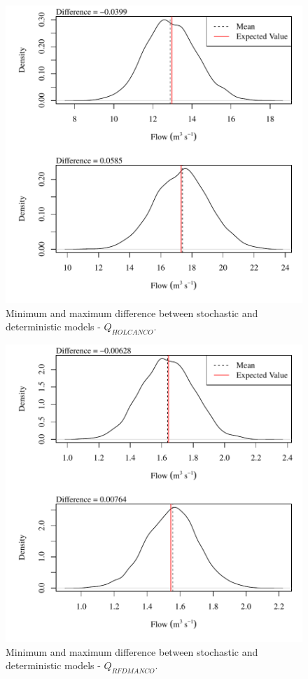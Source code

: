 \begin{center}
\begin{figure}[htbp]
	\includegraphics[width=6in]{"Figures/Results_USR/V min-max diff qHOL"}
	\caption{Minimum and maximum difference between stochastic and deterministic models - $Q_{HOLCANCO}$.}
\end{figure}
\end{center}
\newpage

\begin{center}
\begin{figure}[htbp]
	\includegraphics[width=6in]{"Figures/Results_USR/V min-max diff qRFD"}
	\caption{Minimum and maximum difference between stochastic and deterministic models - $Q_{RFDMANCO}$.}
\end{figure}
\end{center}
\newpage

